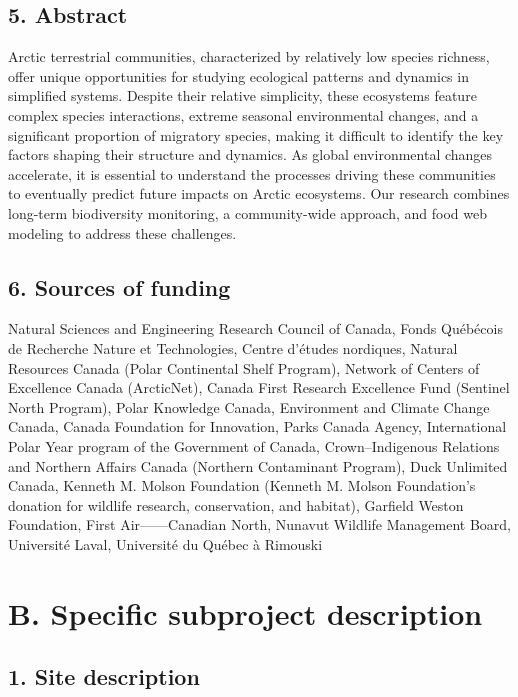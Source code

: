 \documentclass[a4paper,twoside,12pt]{article}
\begin{document}
     \subsection*{5. Abstract}
      Arctic terrestrial communities, characterized by relatively low species richness, offer unique opportunities for studying ecological patterns and dynamics in simplified systems. Despite their relative simplicity, these ecosystems feature complex species interactions, extreme seasonal environmental changes, and a significant proportion of migratory species, making it difficult to identify the key factors shaping their structure and dynamics. As global environmental changes accelerate, it is essential to understand the processes driving these communities to eventually predict future impacts on Arctic ecosystems. Our research combines long-term biodiversity monitoring, a community-wide approach, and food web modeling to address these challenges.
       
      \subsection*{6. Sources of funding}
Natural Sciences and Engineering Research Council of Canada, Fonds Québécois de Recherche Nature et Technologies, Centre d'études nordiques, Natural Resources Canada (Polar Continental Shelf Program), Network of Centers of Excellence Canada (ArcticNet), Canada First Research Excellence Fund (Sentinel North Program), Polar Knowledge Canada, Environment and Climate Change Canada, Canada Foundation for Innovation, Parks Canada Agency, International Polar Year program of the Government of Canada, Crown–Indigenous Relations and Northern Affairs Canada (Northern Contaminant Program), Duck Unlimited Canada, Kenneth M. Molson Foundation (Kenneth M. Molson Foundation’s donation for wildlife research, conservation, and habitat), Garfield Weston Foundation, First Air——Canadian North, Nunavut Wildlife Management Board, Université Laval, Université du Québec à Rimouski
\newpage
        
    \section*{B. Specific subproject description}
        \subsection*{1. Site description}
\end{document}
